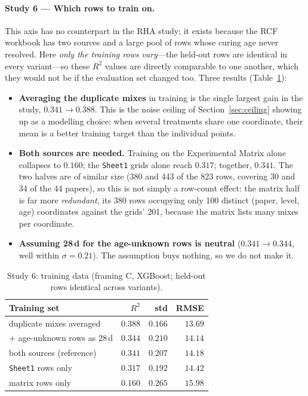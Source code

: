 \documentclass[11pt]{article}
\newcommand{\R}{$R^2$}
\begin{document}
\paragraph{Study 6 --- Which rows to train on.}
This axis has no counterpart in the RHA study; it exists because the RCF workbook
has two sources and a large pool of rows whose curing age never resolved. Here
\emph{only the training rows vary}---the held-out rows are identical in every
variant---so these \R{} values are directly comparable to one another, which they
would not be if the evaluation set changed too. Three results
(Table~\ref{tab:s6}):
\begin{itemize}\itemsep2pt
  \item \textbf{Averaging the duplicate mixes} in training is the single largest
        gain in the study, $0.341\rightarrow0.388$. This is the noise ceiling of
        Section~\ref{sec:ceiling} showing up as a modelling choice: when several
        treatments share one coordinate, their mean is a better training target
        than the individual points.
  \item \textbf{Both sources are needed.} Training on the Experimental Matrix alone
        collapses to $0.160$; the \texttt{Sheet1} grids alone reach $0.317$;
        together, $0.341$. The two halves are of similar size (380 and 443 of the
        823 rows, covering 30 and 34 of the 44 papers), so this is not simply a
        row-count effect: the matrix half is far more \emph{redundant}, its 380
        rows occupying only 100 distinct (paper, level, age) coordinates against
        the grids' 201, because the matrix lists many mixes per coordinate.
  \item \textbf{Assuming 28\,d for the age-unknown rows is neutral}
        ($0.341\rightarrow0.344$, well within $\sigma=0.21$). The assumption buys
        nothing, so we do not make it.
\end{itemize}

\begin{table}[H]\centering\small
\caption{Study 6: training data (framing C, XGBoost; held-out rows identical
across variants).}
\label{tab:s6}
\begin{tabular}{lrrr}
\toprule
Training set & \R{} & std & RMSE \\
\midrule
\rowcolor{green!12}duplicate mixes averaged & $0.388$ & $0.166$ & $13.69$ \\
$+$ age-unknown rows as 28\,d & $0.344$ & $0.210$ & $14.14$ \\
both sources (reference) & $0.341$ & $0.207$ & $14.18$ \\
\texttt{Sheet1} rows only & $0.317$ & $0.192$ & $14.42$ \\
matrix rows only & $0.160$ & $0.265$ & $15.98$ \\
\bottomrule
\end{tabular}
\end{table}
\end{document}
